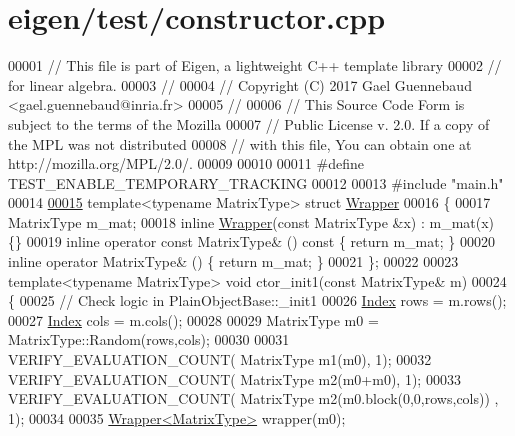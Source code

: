 \hypertarget{eigen_2test_2constructor_8cpp_source}{}\section{eigen/test/constructor.cpp}
\label{eigen_2test_2constructor_8cpp_source}

\begin{DoxyCode}
00001 \textcolor{comment}{// This file is part of Eigen, a lightweight C++ template library}
00002 \textcolor{comment}{// for linear algebra.}
00003 \textcolor{comment}{//}
00004 \textcolor{comment}{// Copyright (C) 2017 Gael Guennebaud <gael.guennebaud@inria.fr>}
00005 \textcolor{comment}{//}
00006 \textcolor{comment}{// This Source Code Form is subject to the terms of the Mozilla}
00007 \textcolor{comment}{// Public License v. 2.0. If a copy of the MPL was not distributed}
00008 \textcolor{comment}{// with this file, You can obtain one at http://mozilla.org/MPL/2.0/.}
00009 
00010 
00011 \textcolor{preprocessor}{#define TEST\_ENABLE\_TEMPORARY\_TRACKING}
00012 
00013 \textcolor{preprocessor}{#include "main.h"}
00014 
\hyperlink{struct_wrapper}{00015} \textcolor{keyword}{template}<\textcolor{keyword}{typename} MatrixType> \textcolor{keyword}{struct }\hyperlink{struct_wrapper}{Wrapper}
00016 \{
00017   MatrixType m\_mat;
00018   \textcolor{keyword}{inline} \hyperlink{struct_wrapper}{Wrapper}(\textcolor{keyword}{const} MatrixType &x) : m\_mat(x) \{\}
00019   \textcolor{keyword}{inline} \textcolor{keyword}{operator} \textcolor{keyword}{const} MatrixType& () \textcolor{keyword}{const} \{ \textcolor{keywordflow}{return} m\_mat; \}
00020   \textcolor{keyword}{inline} \textcolor{keyword}{operator} MatrixType& () \{ \textcolor{keywordflow}{return} m\_mat; \}
00021 \};
00022 
00023 \textcolor{keyword}{template}<\textcolor{keyword}{typename} MatrixType> \textcolor{keywordtype}{void} ctor\_init1(\textcolor{keyword}{const} MatrixType& m)
00024 \{
00025   \textcolor{comment}{// Check logic in PlainObjectBase::\_init1}
00026   \hyperlink{namespace_eigen_a62e77e0933482dafde8fe197d9a2cfde}{Index} rows = m.rows();
00027   \hyperlink{namespace_eigen_a62e77e0933482dafde8fe197d9a2cfde}{Index} cols = m.cols();
00028 
00029   MatrixType m0 = MatrixType::Random(rows,cols);
00030 
00031   VERIFY\_EVALUATION\_COUNT( MatrixType m1(m0), 1);
00032   VERIFY\_EVALUATION\_COUNT( MatrixType m2(m0+m0), 1);
00033   VERIFY\_EVALUATION\_COUNT( MatrixType m2(m0.block(0,0,rows,cols)) , 1);
00034 
00035   \hyperlink{struct_wrapper}{Wrapper<MatrixType>} wrapper(m0);

\end{DoxyCode}
